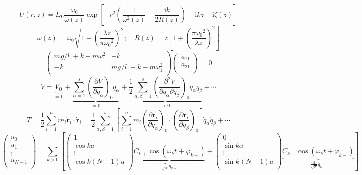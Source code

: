 \documentclass[11pt]{article}
\def\ii{\mathrm{i}}
\def\bm{\symbf}
\begin{document}
\[\tilde{U}(r,z)=E_0\dfrac{\omega_0}{\omega(z)}\exp\left[-r^2\left(\dfrac{1}{\omega^2(z)}+\dfrac{\ii k}{2R(z)}\right)-\ii k z+\ii \zeta(z)\right]\]
\[\omega(z)=\omega_0\sqrt{1+\left(\dfrac{\lambda z}{\pi {\omega_0}^2}\right)^2};\quad R(z)=z\left[1+\left(\dfrac{\pi {\omega_0}^2}{\lambda z}\right)^2\right]\]
\[\left( \begin{matrix}
{mg}/{l}\;+k-m\omega _{1}^{2} & -k  \\
-k & {mg}/{l}\;+k-m\omega _{1}^{2}  \\
\end{matrix} \right)\left( \begin{matrix}
{{a}_{11}}  \\
{{a}_{21}}  \\
\end{matrix} \right)=0\]
\[V=\underbrace{{{V}_{0}}}_{=0}+\underbrace{\sum\limits_{\alpha =1}^{s}{{{\left( \frac{\partial V}{\partial {{q}_{\alpha }}} \right)}_{0}}{{q}_{\alpha }}}}_{=0}+\underbrace{\frac{1}{2}\sum\limits_{\alpha ,\beta =1}^{s}{{{\left( \frac{{{\partial }^{2}}V}{\partial {{q}_{\alpha }}\partial {{q}_{\beta }}} \right)}_{0}}{{q}_{\alpha }}{{q}_{\beta }}}}_{>0}+\cdots \]
\[T=\frac{1}{2}\sum\limits_{i=1}^{n}{{{m}_{i}}{{{\dot{\bm r}}}_{i}}\cdot {{{\dot{\bm r}}}_{i}}}=\frac{1}{2}\sum\limits_{\alpha ,\beta =1}^{s}{\left[ \sum\limits_{i=1}^{n}{{{m}_{i}}{{\left( \frac{\partial {{\bm r}_{i}}}{\partial {{q}_{\alpha }}} \right)}_{0}}\cdot {{\left( \frac{\partial {{\bm r}_{i}}}{\partial {{q}_{\beta }}} \right)}_{0}}} \right]{{{\dot{q}}}_{\alpha }}{{{\dot{q}}}_{\beta }}}+\cdots \]
\[\left( \begin{matrix}
{{u}_{0}}  \\
{{u}_{1}}  \\
\vdots   \\
{{u}_{N-1}}  \\
\end{matrix} \right)=\sum\limits_{k>0}{\left[ \left( \begin{matrix}
	1  \\
	\cos ka  \\
	\vdots   \\
	\cos k\left( N-1 \right)a  \\
	\end{matrix} \right)\underbrace{{{C}_{k+}}\cos \left( {{\omega }_{k}}t+{{\varphi }_{k+}} \right)}_{\frac{2}{\sqrt{N}}{{q}_{k+}}}+\left( \begin{matrix}
	0  \\
	\sin ka  \\
	\vdots   \\
	\sin k\left( N-1 \right)a  \\
	\end{matrix} \right)\underbrace{{{C}_{k-}}\cos \left( {{\omega }_{k}}t+{{\varphi }_{k-}} \right)}_{\frac{2}{\sqrt{N}}{{q}_{k-}}} \right]}\]
\end{document}
